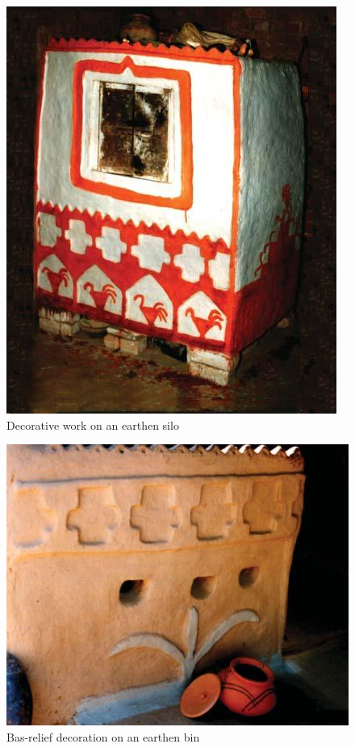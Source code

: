 \begin{figure}[!htbp]
\includegraphics[scale=.34]{images/chap02-26.jpg}
\caption{Decorative work on an earthen silo}\label{chap02-fig26}
\end{figure}


\begin{figure}[H]
\includegraphics[scale=.34]{images/chap02-27.jpg}
\caption{Bas-relief decoration on an earthen bin}\label{chap02-fig27}
\end{figure}


